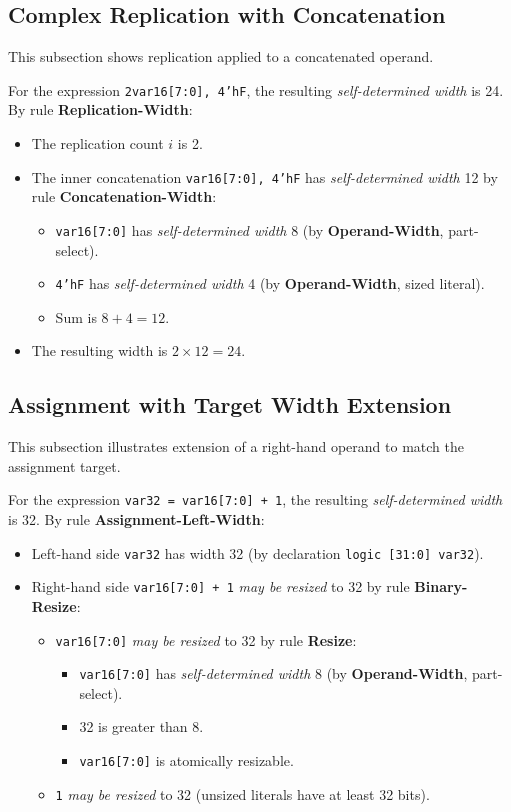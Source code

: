 \documentclass{article}
\newcommand{\sv}[1]{{\color{black}\texttt{#1}}}
\newcommand{\sds}{\emph{self-determined width}}
\newcommand{\mbr}{\emph{may be resized}}
\begin{document}
{\subsection{Complex Replication with Concatenation}

This subsection shows replication applied to a concatenated operand.

For the expression \sv{{2{var16[7:0], 4'hF}}}, the resulting
\sds{} is 24. By rule \textbf{Replication-Width}:
\begin{itemize}
  \item The replication count $i$ is 2.
  \item The inner concatenation \sv{{var16[7:0], 4'hF}} has
    \sds{} 12 by rule \textbf{Concatenation-Width}:
    \begin{itemize}
      \item \sv{var16[7:0]} has \sds{} 8 (by
        \textbf{Operand-Width}, part-select).
      \item \sv{4'hF} has \sds{} 4 (by
        \textbf{Operand-Width}, sized literal).
      \item Sum is $8 + 4 = 12$.
    \end{itemize}
  \item The resulting width is $2 \times 12 = 24$.
\end{itemize}

\subsection{Assignment with Target Width Extension}

This subsection illustrates extension of a right-hand operand to
match the assignment target.

For the expression \sv{var32 = var16[7:0] + 1}, the resulting
\sds{} is 32. By rule \textbf{Assignment-Left-Width}:
\begin{itemize}
  \item Left-hand side \sv{var32} has width 32
    (by declaration \sv{logic [31:0] var32}).
  \item Right-hand side \sv{var16[7:0] + 1} \mbr{} to 32
    by rule \textbf{Binary-Resize}:
    \begin{itemize}
      \item \sv{var16[7:0]} \mbr{} to 32 by rule \textbf{Resize}:
        \begin{itemize}
          \item \sv{var16[7:0]} has \sds{} 8 (by
            \textbf{Operand-Width}, part-select).
          \item 32 is greater than 8.
          \item \sv{var16[7:0]} is atomically resizable.
        \end{itemize}
      \item \sv{1} \mbr{} to 32 (unsized literals have
        at least 32 bits).
    \end{itemize}
\end{itemize}

}
\end{document}

